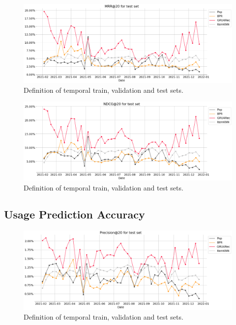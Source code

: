 \begin{figure}[h]
    \centering
    \includegraphics[width=\textwidth]{figs/chap5/test_set_MRR@20.png}
    \caption{Definition of temporal train, validation and test sets.}
    \label{fig:test_set_mrr}
\end{figure}

\begin{figure}[h]
    \centering
    \includegraphics[width=\textwidth]{figs/chap5/test_set_NDCG@20.png}
    \caption{Definition of temporal train, validation and test sets.}
    \label{fig:test_set_ndcg}
\end{figure}

\pagebreak
\subsection{Usage Prediction Accuracy}

\begin{figure}[h]
    \centering
    \includegraphics[width=\textwidth]{figs/chap5/test_set_Precision@20.png}
    \caption{Definition of temporal train, validation and test sets.}
    \label{fig:test_set_precision}
\end{figure}

